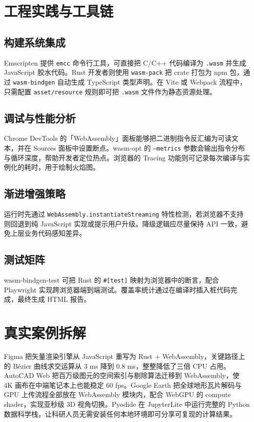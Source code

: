 \chapter{工程实践与工具链}
\section{构建系统集成}
Emscripten 提供 \texttt{emcc} 命令行工具，可直接把 C/C++ 代码编译为 \texttt{.wasm} 并生成 JavaScript 胶水代码。Rust 开发者则使用 \texttt{wasm-pack} 把 crate 打包为 npm 包，通过 \texttt{wasm-bindgen} 自动生成 TypeScript 类型声明。在 Vite 或 Webpack 流程中，只需配置 \texttt{asset/resource} 规则即可把 \texttt{.wasm} 文件作为静态资源处理。\par
\section{调试与性能分析}
Chrome DevTools 的「WebAssembly」面板能够把二进制指令反汇编为可读文本，并在 Sources 面板中设置断点。wasm-opt 的 \texttt{--metrics} 参数会输出指令分布与循环深度，帮助开发者定位热点。浏览器的 Tracing 功能则可记录每次编译与实例化的耗时，用于绘制火焰图。\par
\section{渐进增强策略}
运行时先通过 \texttt{WebAssembly.instantiateStreaming} 特性检测，若浏览器不支持则回退到纯 JavaScript 实现或提示用户升级。降级逻辑应尽量保持 API 一致，避免上层业务代码感知差异。\par
\section{测试矩阵}
wasm-bindgen-test 可把 Rust 的 \texttt{\#{}[test]} 映射为浏览器中的断言，配合 Playwright 实现跨浏览器端到端测试。覆盖率统计通过在编译时插入桩代码完成，最终生成 HTML 报告。\par
\chapter{真实案例拆解}
Figma 把矢量渲染引擎从 JavaScript 重写为 Rust + WebAssembly，关键路径上的 Bézier 曲线求交运算从 3 ms 降到 0.8 ms，整整降低了三倍 CPU 占用。AutoCAD Web 把百万级图元的空间索引与剔除算法迁移到 WebAssembly，使 4K 画布在中端笔记本上也能稳定 60 fps。Google Earth 把全球地形瓦片解码与 GPU 上传流程全部放在 WebAssembly 模块内，配合 WebGPU 的 compute shader，实现亚秒级 3D 视角切换。Pyodide 在 JupyterLite 中运行完整的 Python 数据科学栈，让科研人员无需安装任何本地环境即可分享可复现的计算结果。\par
